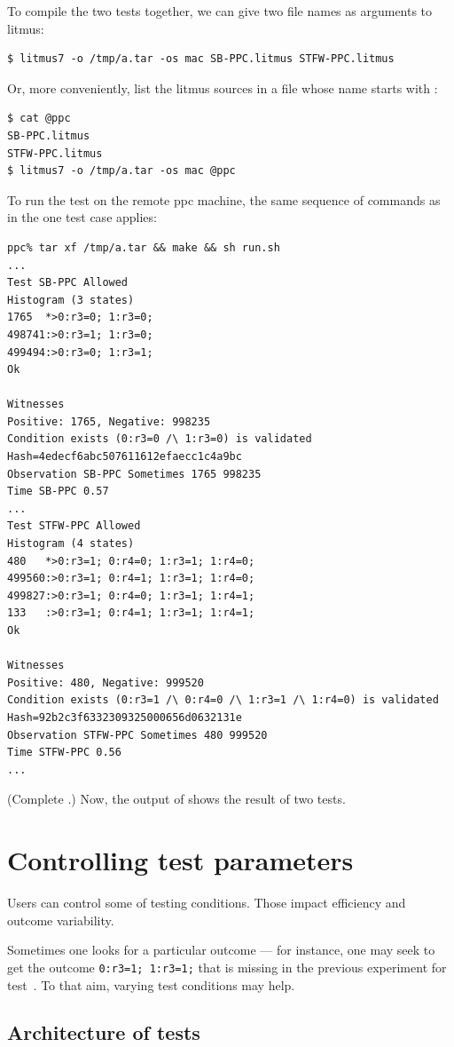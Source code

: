 To compile the two tests together,
we can give two file names as arguments to litmus:
\begin{verbatim}
$ litmus7 -o /tmp/a.tar -os mac SB-PPC.litmus STFW-PPC.litmus
\end{verbatim}
Or, more conveniently, list the litmus sources in a file whose
name starts with :
\begin{verbatim}
$ cat @ppc
SB-PPC.litmus
STFW-PPC.litmus
$ litmus7 -o /tmp/a.tar -os mac @ppc
\end{verbatim}
To run the test on the remote ppc machine, the same sequence
of commands as in the one test case applies:
\begin{verbatim}
ppc% tar xf /tmp/a.tar && make && sh run.sh
...
Test SB-PPC Allowed
Histogram (3 states)
1765  *>0:r3=0; 1:r3=0;
498741:>0:r3=1; 1:r3=0;
499494:>0:r3=0; 1:r3=1;
Ok

Witnesses
Positive: 1765, Negative: 998235
Condition exists (0:r3=0 /\ 1:r3=0) is validated
Hash=4edecf6abc507611612efaecc1c4a9bc
Observation SB-PPC Sometimes 1765 998235
Time SB-PPC 0.57
...
Test STFW-PPC Allowed
Histogram (4 states)
480   *>0:r3=1; 0:r4=0; 1:r3=1; 1:r4=0;
499560:>0:r3=1; 0:r4=1; 1:r3=1; 1:r4=0;
499827:>0:r3=1; 0:r4=0; 1:r3=1; 1:r4=1;
133   :>0:r3=1; 0:r4=1; 1:r3=1; 1:r4=1;
Ok

Witnesses
Positive: 480, Negative: 999520
Condition exists (0:r3=1 /\ 0:r4=0 /\ 1:r3=1 /\ 1:r4=0) is validated
Hash=92b2c3f6332309325000656d0632131e
Observation STFW-PPC Sometimes 480 999520
Time STFW-PPC 0.56
...
\end{verbatim}
\ifhevea(Complete .) \fi
Now, the output of  shows the result of two tests.

\section{Controlling\label{litmus:control} test parameters}
Users can control some of testing conditions.
Those impact efficiency and outcome variability.

Sometimes one looks for a particular outcome
--- for instance, one may seek to get the
outcome \verb+0:r3=1; 1:r3=1;+ that is missing
in the previous experiment for test~.
To that aim, varying test conditions may help.


\subsection{\label{sec:arch}Architecture of tests}

